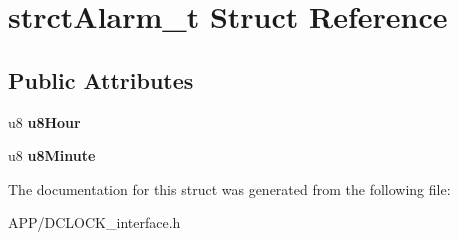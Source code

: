 \hypertarget{structstrct_alarm__t}{}\section{strct\+Alarm\+\_\+t Struct Reference}
\label{structstrct_alarm__t}
\subsection*{Public Attributes}
\begin{DoxyCompactItemize}
\item 
\mbox{\label{structstrct_alarm__t_a91c6b4272ad338a9c17ada5c83b29e71}} 
u8 {\bfseries u8\+Hour}
\item 
\mbox{\label{structstrct_alarm__t_aba587428141558a90e29b3e0e46ac0d7}} 
u8 {\bfseries u8\+Minute}
\end{DoxyCompactItemize}


The documentation for this struct was generated from the following file\+:\begin{DoxyCompactItemize}
\item 
A\+P\+P/D\+C\+L\+O\+C\+K\+\_\+interface.\+h\end{DoxyCompactItemize}
